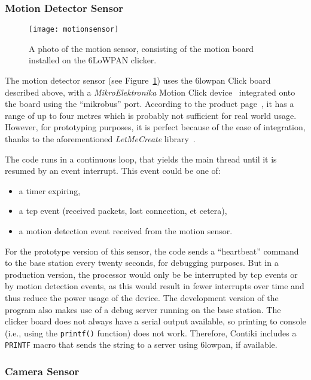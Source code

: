\subsubsection{Motion Detector Sensor}
\begin{figure}
  \centering
  \texttt{[image: motionsensor]}
  \caption{A photo of the motion sensor, consisting of the motion board
  installed on the 6LoWPAN clicker.}
  \label{fig:motionsensor}
\end{figure}
The motion detector sensor (see Figure~\ref{fig:motionsensor}) uses the
\gls{6lowpan} Click board described above, with a \textit{MikroElektronika}
Motion Click device~\cite{motionclick} integrated onto the board using the
``\gls{mikrobus}'' port. According to the product page~\cite{motionclick}, it
has a range of up to four metres which is probably not sufficient for real
world usage. However, for prototyping purposes, it is perfect because of the
ease of integration, thanks to the aforementioned \textit{LetMeCreate}
library~\cite{letmecreate}.

The code runs in a continuous loop, that yields the main thread until it is
resumed by an event interrupt. This event could be one of:

\begin{itemize}
  \item a timer expiring,
  \item a \acrshort{tcp} event (received packets, lost connection, et cetera),
  \item a motion detection event received from the motion sensor.
\end{itemize}

For the prototype version of this sensor, the code sends a ``heartbeat''
command to the base station every twenty seconds, for debugging purposes. But
in a production version, the processor would only be be interrupted by
\acrshort{tcp} events or by motion detection events, as this would result in
fewer interrupts over time and thus reduce the power usage of the device. The
development version of the program also makes use of a debug server running
on the base station. The clicker board does not always have a serial
output available, so printing to console (i.e., using the \texttt{printf()}
function) does not work. Therefore, Contiki includes a \texttt{PRINTF} macro
that sends the string to a server using \gls{6lowpan}, if available.

\subsubsection{Camera Sensor}

